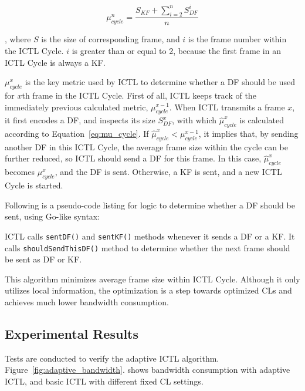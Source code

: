 \documentclass[12pt]{report}
\begin{document}
\begin{equation}
  \mu_{cycle}^n = \frac{S_{KF} + \sum_{i=2}^{n}{S_{DF}^i}}{n}
  \label{eq:mu_cycle}
\end{equation}

, where $S$ is the size of corresponding frame, and $i$ is the frame number within the ICTL Cycle. $i$ is greater than or equal to 2, because the first frame in an ICTL Cycle is always a KF.

$\mu_{cycle}^x$ is the key metric used by ICTL to determine whether a DF should be used for $x$th frame in the ICTL Cycle. First of all, ICTL keeps track of the immediately previous calculated metric, $\mu_{cycle}^{x-1}$. When ICTL transmits a frame $x$, it first encodes a DF, and inspects its size $S_{DF}^x$, with which $\hat{\mu}_{cycle}^x$ is calculated according to Equation~\ref{eq:mu_cycle}. If $\hat{\mu}_{cycle}^x < \mu_{cycle}^{x-1}$, it implies that, by sending another DF in this ICTL Cycle, the average frame size within the cycle can be further reduced, so ICTL should send a DF for this frame. In this case, $\hat{\mu}_{cycle}^x$ becomes $\mu_{cycle}^x$, and the DF is sent. Otherwise, a KF is sent, and a new ICTL Cycle is started.

Following is a pseudo-code listing for logic to determine whether a DF should be sent, using Go-like syntax:

\begin{singlespace}
  
\end{singlespace}

ICTL calls \texttt{sentDF()} and \texttt{sentKF()} methods whenever it sends a DF or a KF. It calls \texttt{shouldSendThisDF()} method to determine whether the next frame should be sent as DF or KF.

This algorithm minimizes average frame size within ICTL Cycle. Although it only utilizes local information, the optimization is a step towards optimized CLs and achieves much lower bandwidth consumption.

\subsection{Experimental Results}

Tests are conducted to verify the adaptive ICTL algorithm. Figure~\ref{fig:adaptive_bandwidth}. shows bandwidth consumption with adaptive ICTL, and basic ICTL with different fixed CL settings.
\end{document}
